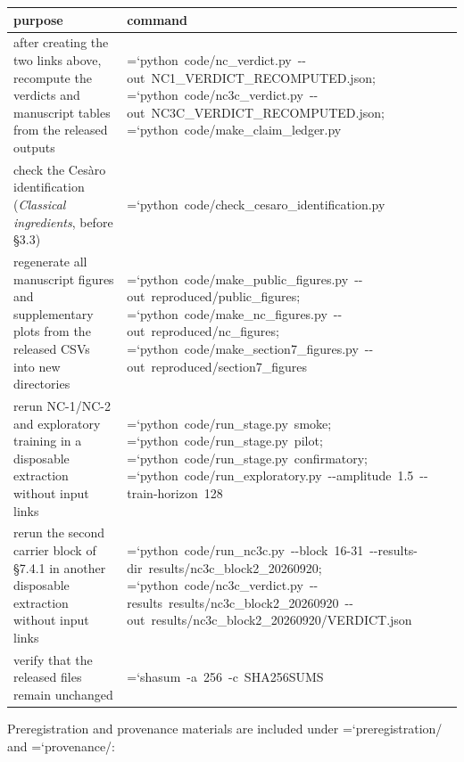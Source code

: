 \documentclass[
  10pt,
]{article}
\newcounter{none} %
\renewcommand{\texttt}[1]{\begingroup\ttfamily\hyphenchar\font=`\-\relax\spaceskip=0pt\hskip0pt\allowbreak#1\endgroup}
\begin{document}
{\def\LTcaptype{none} %
\begin{longtable}[]{@{}
  >{\raggedright\arraybackslash}p{}
  >{\raggedright\arraybackslash}p{}@{}}
\toprule\noalign{}
\begin{minipage}[b]{\linewidth}\raggedright
purpose
\end{minipage} & \begin{minipage}[b]{\linewidth}\raggedright
command
\end{minipage} \\
\midrule\noalign{}
\endhead
\bottomrule\noalign{}
\endlastfoot
after creating the two links above, recompute the verdicts and
manuscript tables from the released outputs &
\texttt{python\ code/nc\_verdict.py\ -\/-out\ NC1\_VERDICT\_RECOMPUTED.json};
\texttt{python\ code/nc3c\_verdict.py\ -\/-out\ NC3C\_VERDICT\_RECOMPUTED.json};
\texttt{python\ code/make\_claim\_ledger.py} \\
check the Cesàro identification (\emph{Classical ingredients}, before
§3.3) & \texttt{python\ code/check\_cesaro\_identification.py} \\
regenerate all manuscript figures and supplementary plots from the
released CSVs into new directories &
\texttt{python\ code/make\_public\_figures.py\ -\/-out\ reproduced/public\_figures};
\texttt{python\ code/make\_nc\_figures.py\ -\/-out\ reproduced/nc\_figures};
\texttt{python\ code/make\_section7\_figures.py\ -\/-out\ reproduced/section7\_figures} \\
rerun NC-1/NC-2 and exploratory training in a disposable extraction
without input links & \texttt{python\ code/run\_stage.py\ smoke};
\texttt{python\ code/run\_stage.py\ pilot};
\texttt{python\ code/run\_stage.py\ confirmatory};
\texttt{python\ code/run\_exploratory.py\ -\/-amplitude\ 1.5\ -\/-train-horizon\ 128} \\
rerun the second carrier block of §7.4.1 in another disposable
extraction without input links &
\texttt{python\ code/run\_nc3c.py\ -\/-block\ 16-31\ -\/-results-dir\ results/nc3c\_block2\_20260920};
\texttt{python\ code/nc3c\_verdict.py\ -\/-results\ results/nc3c\_block2\_20260920\ -\/-out\ results/nc3c\_block2\_20260920/VERDICT.json} \\
verify that the released files remain unchanged &
\texttt{shasum\ -a\ 256\ -c\ SHA256SUMS} \\
\end{longtable}
}

Preregistration and provenance materials are included under
\texttt{preregistration/} and \texttt{provenance/}:
\end{document}
